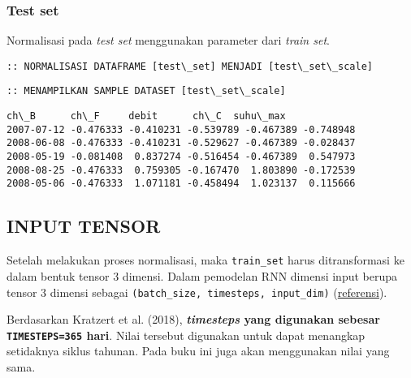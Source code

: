 \documentclass[11pt]{article}
\makeatletter
\newcommand{\boxspacing}{\kern\kvtcb@left@rule\kern\kvtcb@boxsep}
\newcommand{\prompt}[4]{
        \ttfamily\llap{{\color{#2}[#3]:\hspace{3pt}#4}}\vspace{-\baselineskip}
    }
\makeatother
\begin{document}
    \hypertarget{test-set}{%
\subsubsection{Test set}\label{test-set}}

Normalisasi pada \emph{test set} menggunakan parameter dari \emph{train
set}.

    \begin{Verbatim}[commandchars=\\\{\}]
:: NORMALISASI DATAFRAME [test\_set] MENJADI [test\_set\_scale]
    \end{Verbatim}

    \begin{Verbatim}[commandchars=\\\{\}]
:: MENAMPILKAN SAMPLE DATASET [test\_set\_scale]
    \end{Verbatim}

            \begin{tcolorbox}[breakable, size=fbox, boxrule=.5pt, pad at break*=1mm, opacityfill=0]
\prompt{Out}{outcolor}{0}{\boxspacing}
\begin{Verbatim}[commandchars=\\\{\}]
                ch\_B      ch\_F     debit      ch\_C  suhu\_max
2007-07-12 -0.476333 -0.410231 -0.539789 -0.467389 -0.748948
2008-06-08 -0.476333 -0.410231 -0.529627 -0.467389 -0.028437
2008-05-19 -0.081408  0.837274 -0.516454 -0.467389  0.547973
2008-08-25 -0.476333  0.759305 -0.167470  1.803890 -0.172539
2008-05-06 -0.476333  1.071181 -0.458494  1.023137  0.115666
\end{Verbatim}
\end{tcolorbox}
        
    \hypertarget{input-tensor}{%
\subsection{INPUT TENSOR}\label{input-tensor}}

Setelah melakukan proses normalisasi, maka \texttt{train\_set} harus
ditransformasi ke dalam bentuk tensor 3 dimensi. Dalam pemodelan RNN
dimensi input berupa tensor 3 dimensi sebagai
\texttt{(batch\_size,\ timesteps,\ input\_dim)}
(\href{https://keras.io/layers/recurrent/}{referensi}).

Berdasarkan Kratzert et al. (2018), \textbf{\emph{timesteps} yang
digunakan sebesar \texttt{TIMESTEPS=365} hari}. Nilai tersebut digunakan
untuk dapat menangkap setidaknya siklus tahunan. Pada buku ini juga akan
menggunakan nilai yang sama.
\end{document}
